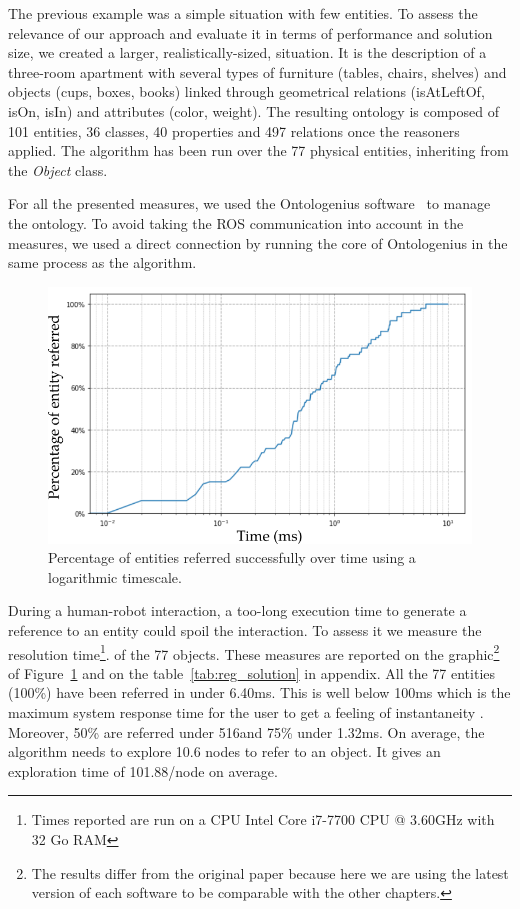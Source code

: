 The previous example was a simple situation with few entities. To assess the relevance of our approach and evaluate it in terms of performance and solution size, we created a larger, realistically-sized, situation. It is the description of a three-room apartment with several types of furniture (tables, chairs, shelves) and objects (cups, boxes, books) linked through geometrical relations (isAtLeftOf, isOn, isIn) and attributes (color, weight). The resulting ontology is composed of 101 entities, 36 classes, 40 properties and 497 relations once the reasoners applied. The algorithm has been run over the 77 physical entities, inheriting from the \textit{Object} class.

For all the presented measures, we used the Ontologenius software~\cite{sarthou_2019_ontologenius} to manage the ontology. To avoid taking the ROS communication into account in the measures, we used a direct connection by running the core of Ontologenius in the same process as the algorithm.

\begin{figure}[h!]
\centering
\includegraphics[scale=0.55]{figures/chapter4/scaling_up_percentage.png}
\caption{\label{fig:chap4_percentage} Percentage of entities referred successfully over time using a logarithmic timescale. }
\end{figure}

During a human-robot interaction, a too-long execution time to generate a reference to an entity could spoil the interaction. To assess it we measure the resolution time\footnote{Times reported are run on a CPU Intel Core i7-7700 CPU @ 3.60GHz with 32 Go RAM}. of the 77 objects. These measures are reported on the graphic\footnote{The results differ from the original paper because here we are using the latest version of each software to be comparable with the other chapters.} of Figure~\ref{fig:chap4_percentage} and on the table~\ref{tab:reg_solution} in appendix. All the 77 entities (100\%) have been referred in under 6.40ms. This is well below 100ms which is the maximum system response time for the user to get a feeling of instantaneity \cite{miller_1968_response}. Moreover, 50\% are referred under 516\us and 75\% under 1.32ms. On average, the algorithm needs to explore 10.6 nodes to refer to an object. It gives an exploration time of 101.88\us/node on average.

